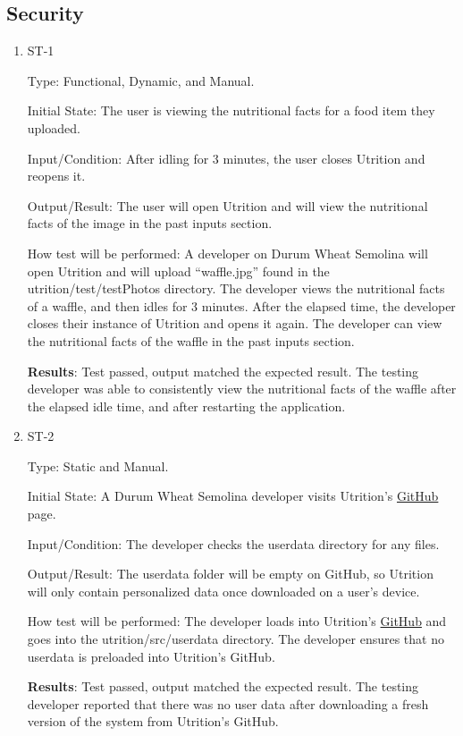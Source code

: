 \documentclass[12pt, titlepage]{article}
\begin{document}
	\subsection{Security}
	
	\begin{enumerate}
		
		\item{ST-1} 
		
		Type: Functional, Dynamic, and Manual.
		
		Initial State: The user is viewing the nutritional facts for a food item they uploaded.
		
		Input/Condition: After idling for 3 minutes, the user closes Utrition and reopens it.
		
		Output/Result: The user will open Utrition and will view the nutritional facts of the image in the past inputs section.
		
		How test will be performed: A developer on Durum Wheat Semolina will open Utrition and will upload “waffle.jpg” found in the utrition/test/testPhotos directory. The developer views the nutritional facts of a waffle, and then idles for 3 minutes. After the elapsed time, the developer closes their instance of Utrition and opens it again. The developer can view the nutritional facts of the waffle in the past inputs section.
		
		\textbf{Results}: Test passed, output matched the expected result. The testing developer was able to consistently view the nutritional facts of the waffle after the elapsed idle time, and after restarting the application. 
		
		\item{ST-2} 
		
		Type: Static and Manual.
		
		Initial State: A Durum Wheat Semolina developer visits Utrition’s \href{https://github.com/jeff-rey-wang/utrition/}{GitHub} page.
		
		Input/Condition: The developer checks the userdata directory for any files.
		
		Output/Result: The userdata folder will be empty on GitHub, so Utrition will only contain personalized data once downloaded on a user's device.
		
		How test will be performed: The developer loads into Utrition’s \href{https://github.com/jeff-rey-wang/utrition/}{GitHub} and goes into the utrition/src/userdata directory. The developer ensures that no userdata is preloaded into Utrition’s GitHub.
		
		\textbf{Results}: Test passed, output matched the expected result. The testing developer reported that there was no user data after downloading a fresh version of the system from Utrition's GitHub.
		
		
	\end{enumerate}
	
\end{document}
